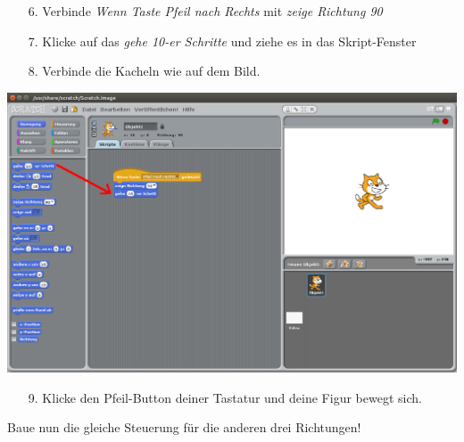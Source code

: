 \begin{itemize}
\item[6.] Verbinde \textit{Wenn Taste Pfeil nach Rechts} mit \textit{zeige Richtung 90}
\item[7.] Klicke auf das \textit{gehe 10-er Schritte} und ziehe es in das Skript-Fenster 
\item[8.] Verbinde die Kacheln wie auf dem Bild. 
\end{itemize}
\includegraphics[width=\textwidth]{images/aufgabe1_bewegung_verschieben2.png}

\begin{itemize}
\item[9.] Klicke den Pfeil-Button deiner Tastatur und deine Figur bewegt sich.
\end{itemize}

Baue nun die gleiche Steuerung für die anderen drei Richtungen!

